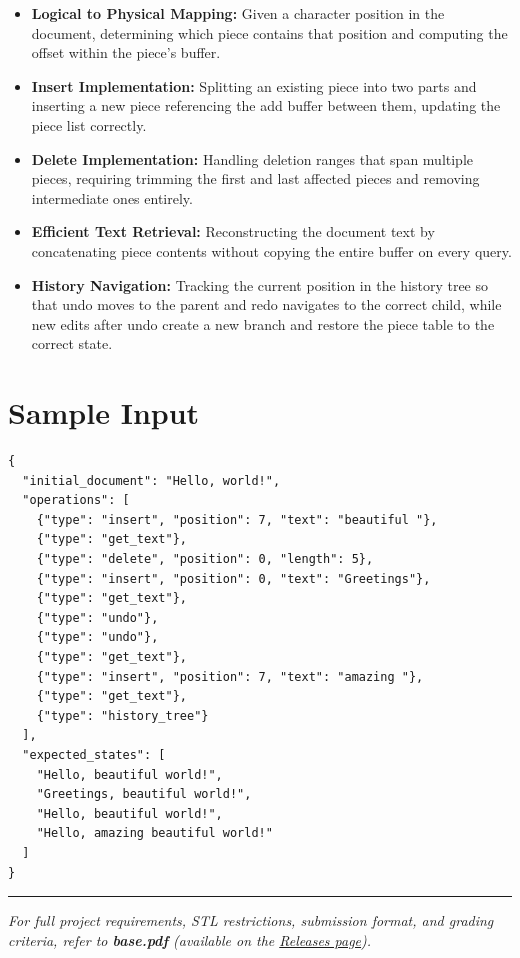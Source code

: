 \begin{itemize}
  \item \textbf{Logical to Physical Mapping:} Given a character position in the document, determining which piece contains that position and computing the offset within the piece's buffer.
  \item \textbf{Insert Implementation:} Splitting an existing piece into two parts and inserting a new piece referencing the add buffer between them, updating the piece list correctly.
  \item \textbf{Delete Implementation:} Handling deletion ranges that span multiple pieces, requiring trimming the first and last affected pieces and removing intermediate ones entirely.
  \item \textbf{Efficient Text Retrieval:} Reconstructing the document text by concatenating piece contents without copying the entire buffer on every query.
  \item \textbf{History Navigation:} Tracking the current position in the history tree so that undo moves to the parent and redo navigates to the correct child, while new edits after undo create a new branch and restore the piece table to the correct state.
\end{itemize}

\section{Sample Input}

\begin{lstlisting}[style=json, caption={data/input\_sample.json}]
{
  "initial_document": "Hello, world!",
  "operations": [
    {"type": "insert", "position": 7, "text": "beautiful "},
    {"type": "get_text"},
    {"type": "delete", "position": 0, "length": 5},
    {"type": "insert", "position": 0, "text": "Greetings"},
    {"type": "get_text"},
    {"type": "undo"},
    {"type": "undo"},
    {"type": "get_text"},
    {"type": "insert", "position": 7, "text": "amazing "},
    {"type": "get_text"},
    {"type": "history_tree"}
  ],
  "expected_states": [
    "Hello, beautiful world!",
    "Greetings, beautiful world!",
    "Hello, beautiful world!",
    "Hello, amazing beautiful world!"
  ]
}
\end{lstlisting}

\vfill
\noindent\rule{\textwidth}{0.4pt}
{\small\textit{For full project requirements, STL restrictions, submission format, and grading criteria, refer to \textbf{base.pdf} (available on the \href{https://github.com/BestSithInEU/cse211-term-projects/releases}{Releases page}).}}
